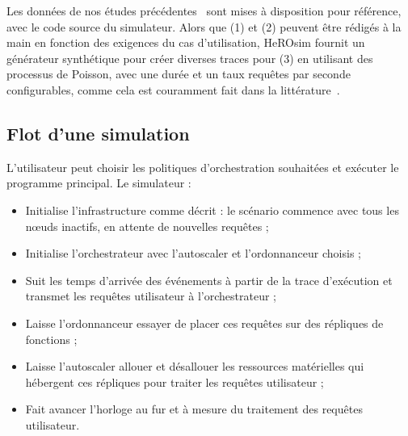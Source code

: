 Les données de nos études précédentes~\cite{herofake, herocache} sont mises à disposition pour référence, avec le code source du simulateur. Alors que (1) et (2) peuvent être rédigés à la main en fonction des exigences du cas d'utilisation, HeROsim fournit un générateur synthétique pour créer diverses traces pour (3) en utilisant des processus de Poisson, avec une durée et un taux requêtes par seconde configurables, comme cela est couramment fait dans la littérature~\cite{herocache}. 

\subsection{Flot d'une simulation}

L'utilisateur peut choisir les politiques d'orchestration souhaitées et exécuter le programme principal. Le simulateur :

\begin{itemize}
    \item Initialise l'infrastructure comme décrit : le scénario commence avec tous les nœuds inactifs, en attente de nouvelles requêtes ;
    \item Initialise l'orchestrateur avec l'autoscaler et l'ordonnanceur choisis ;
    \item Suit les temps d'arrivée des événements à partir de la trace d'exécution et transmet les requêtes utilisateur à l'orchestrateur ;
    \item Laisse l'ordonnanceur essayer de placer ces requêtes sur des répliques de fonctions ;
    \item Laisse l'autoscaler allouer et désallouer les ressources matérielles qui hébergent ces répliques pour traiter les requêtes utilisateur ;
    \item Fait avancer l'horloge au fur et à mesure du traitement des requêtes utilisateur.
\end{itemize}


